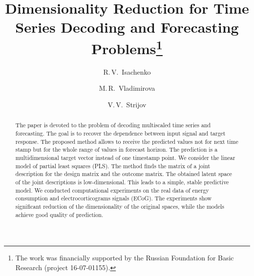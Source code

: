 \documentclass[runningheads]{llncs}
\begin{document}
	\title
	{Dimensionality Reduction for Time Series Decoding and Forecasting Problems\thanks{The work was financially supported by the Russian Foundation for Basic Research (project 16-07-01155).}}
	\author{R.\,V.~Isachenko \and
M.\,R.~Vladimirova \and
V.\,V.~Strijov}
	\maketitle
\begin{abstract}
	The paper is devoted to the problem of decoding multiscaled time series and forecasting.
	The goal is to recover the dependence between input signal and target response.
	The proposed method allows to receive the predicted values not for next time stamp but for the whole range of values in forecast horizon.
	The prediction is a multidimensional target vector instead of one timestamp point. 
	We consider the linear model of partial least squares (PLS).
	The method finds the matrix of a joint description for the design matrix and the outcome matrix.
	The obtained latent space of the joint descriptions is low-dimensional.
	This leads to a simple, stable predictive model.
	We conducted computational experiments on the real data of energy consumption and electrocorticograms signals (ECoG). 
	The experiments show significant reduction of the dimensionality of the original spaces, while the models achieve good quality of prediction.
\end{abstract}	

\end{document}

